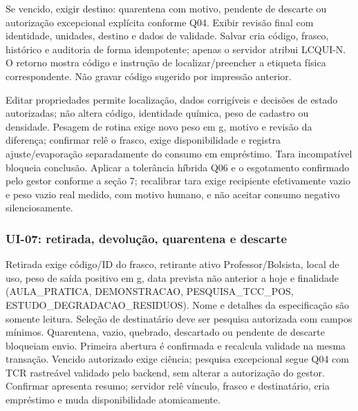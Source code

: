 Se vencido, exigir destino: quarentena com motivo, pendente de descarte ou autorização excepcional explícita conforme Q04. Exibir revisão final com identidade, unidades, destino e dados de validade. Salvar cria código, frasco, histórico e auditoria de forma idempotente; apenas o servidor atribui LCQUI-N. O retorno mostra código e instrução de localizar/preencher a etiqueta física correspondente. Não gravar código sugerido por impressão anterior.

Editar propriedades permite localização, dados corrigíveis e decisões de estado autorizadas; não altera código, identidade química, peso de cadastro ou densidade. Pesagem de rotina exige novo peso em g, motivo e revisão da diferença; confirmar relê o frasco, exige disponibilidade e registra ajuste/evaporação separadamente do consumo em empréstimo. Tara incompatível bloqueia conclusão. Aplicar a tolerância híbrida Q06 e o esgotamento confirmado pelo gestor conforme a seção 7; recalibrar tara exige recipiente efetivamente vazio e peso vazio real medido, com motivo humano, e não aceitar consumo negativo silenciosamente.

\subsubsection{UI-07: retirada, devolução, quarentena e descarte}
Retirada exige código/ID do frasco, retirante ativo Professor/Bolsista, local de uso, peso de saída positivo em g, data prevista não anterior a hoje e finalidade (AULA\_PRATICA, DEMONSTRACAO, PESQUISA\_TCC\_POS, ESTUDO\_DEGRADACAO\_RESIDUOS). Nome e detalhes da especificação são somente leitura. Seleção de destinatário deve ser pesquisa autorizada com campos mínimos. Quarentena, vazio, quebrado, descartado ou pendente de descarte bloqueiam envio. Primeira abertura é confirmada e recalcula validade na mesma transação. Vencido autorizado exige ciência; pesquisa excepcional segue Q04 com TCR rastreável validado pelo backend, sem alterar a autorização do gestor. Confirmar apresenta resumo; servidor relê vínculo, frasco e destinatário, cria empréstimo e muda disponibilidade atomicamente.

